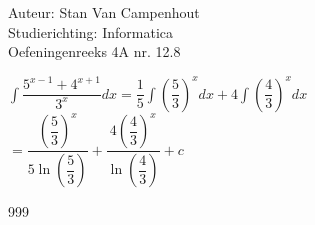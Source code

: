 \documentclass[a4paper]{article}
\begin{document}
  
\noindent \large Auteur: Stan Van Campenhout \\
\noindent \large Studierichting:  Informatica\\
\noindent \large Oefeningenreeks 4A nr. 12.8\\

\medskip

\normalsize

$ \displaystyle\int\dfrac{5^{x-1}+4^{x+1}}{3^x} dx = \dfrac{1}{5}\displaystyle\int\left(\dfrac{5}{3}\right)^xdx+4\displaystyle\int\left(\dfrac{4}{3}\right)^xdx $\\

$ = \dfrac{\left(\dfrac{5}{3}\right)^x}{5\ln\left(\dfrac{5}{3}\right)} + \dfrac{4\left(\dfrac{4}{3}\right)^x}{\ln\left(\dfrac{4}{3}\right)} + c $\\

\begin{thebibliography}{999}
\end{thebibliography}
\end{document}

